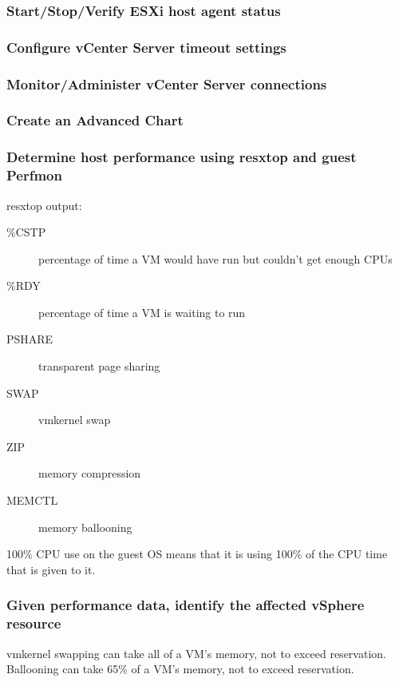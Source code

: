 \subsubsection{Start/Stop/Verify ESXi host agent status}

\subsubsection{Configure vCenter Server timeout settings}

\subsubsection{Monitor/Administer vCenter Server connections}

\subsubsection{Create an Advanced Chart}

\subsubsection{Determine host performance using resxtop and guest Perfmon}

resxtop output:

\begin{description}

\item[\%CSTP]
percentage of time a VM would have run but couldn't get enough CPUs

\item[\%RDY]
percentage of time a VM is waiting to run

\item[PSHARE]
transparent page sharing

\item[SWAP]
vmkernel swap

\item[ZIP]
memory compression

\item[MEMCTL]
memory ballooning

\end{description}

100\% CPU use on the guest OS means that it is using 100\% of the CPU time
that is given to it.

\subsubsection{Given performance data, identify the affected vSphere resource}

vmkernel swapping can take all of a VM's memory, not to exceed reservation.\\

Ballooning can take 65\% of a VM's memory, not to exceed reservation.
